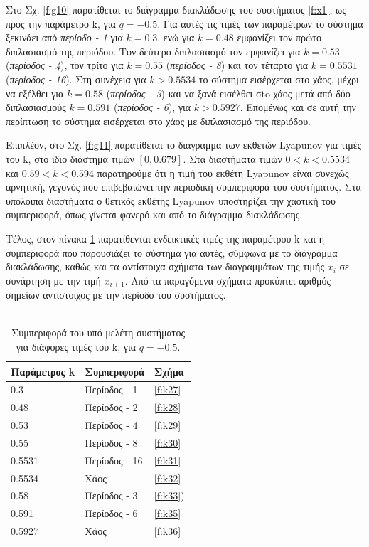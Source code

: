 Στο Σχ. \ref{f:g10} παρατίθεται το διάγραμμα διακλάδωσης του συστήματος \ref{f:x1}, ως προς την παράμετρο k, για $q =- 0.5$. Για αυτές τις τιμές των παραμέτρων το σύστημα ξεκινάει από \emph{περίοδο - 1} για $k=0.3$, ενώ για  $k=0.48$ εμφανίζει τον πρώτο διπλασιασμό της περιόδου. Τον δεύτερο διπλασιασμό τον εμφανίζει για $k=0.53$ (\emph{περίοδος -   4}), τον τρίτο για $k=0.55$  (\emph{περίοδος -   8}) και τον τέταρτο για $k=0.5531$ (\emph{περίοδος -   16}). Στη συνέχεια για $k>0.5534$ το σύστημα εισέρχεται στο χάος, μέχρι να εξέλθει για $k=0.58$ (\emph{περίοδος -   3}) και να ξανά εισέλθει σto χάος μετά από δύο διπλασιασμούς $k=0.591$ (\emph{περίοδος -   6}), για $k>0.5927$.
Επομένως και σε αυτή την περίπτωση το σύστημα εισέρχεται στο χάος με διπλασιασμό της περιόδου. 

Επιπλέον, στο Σχ. \ref{f:g11} παρατίθεται το διάγραμμα των εκθετών Lyapunov για τιμές του k, στο ίδιο διάστημα τιμών $[0, 0.679]$.  Στα διαστήματα τιμών $0<k<0.5534$ και $0.59<k<0.594$ παρατηρούμε ότι η τιμή του εκθέτη Lyapunov είναι συνεχώς αρνητική, γεγονός που επιβεβαιώνει την περιοδική συμπεριφορά του συστήματος. Στα υπόλοιπα διαστήματα ο θετικός εκθέτης Lyapunov υποστηρίζει την χαοτική του συμπεριφορά, όπως γίνεται φανερό και από το διάγραμμα διακλάδωσης.

Τέλος, στον πίνακα \ref{tab:abc2} παρατίθενται ενδεικτικές τιμές της παραμέτρου k και η συμπεριφορά που παρουσιάζει το σύστημα για αυτές, σύμφωνα με το διάγραμμα διακλάδωσης, καθώς και τα αντίστοιχα σχήματα των διαγραμμάτων της τιμής \(x_i\) σε συνάρτηση με την τιμή \(x_{i+1}\). Από τα παραγόμενα σχήματα προκύπτει αριθμός σημείων αντίστοιχος με την περίοδο του συστήματος.\\\\

\begin{table}[ht]
	\centering
	\caption{ Συμπεριφορά του υπό μελέτη συστήματος για διάφορες τιμές του k, για $q=-0.5$.}
	\label{tab:abc2}
	\begin{tabular}{l | l | l}
		Παράμετρος k & Συμπεριφορά & Σχήμα\\
		\hline
		0.3 &  Περίοδος - 1 & \ref{f:k27}\\
		0.48& Περίοδος - 2 & \ref{f:k28}\\
		0.53& Περίοδος - 4 & \ref{f:k29}\\
		0.55 &  Περίοδος - 8 & \ref{f:k30}\\
		0.5531 & Περίοδος - 16 & \ref{f:k31}\ \\
		0.5534 & Χάος & \ref{f:k32}\\
		0.58 & Περίοδος - 3 & \ref{f:k33})\\
		0.591 & Περίοδος - 6 & \ref{f:k35}\\
		0.5927 & Χάος & \ref{f:k36}\\
	\end{tabular}
	
\end{table}

